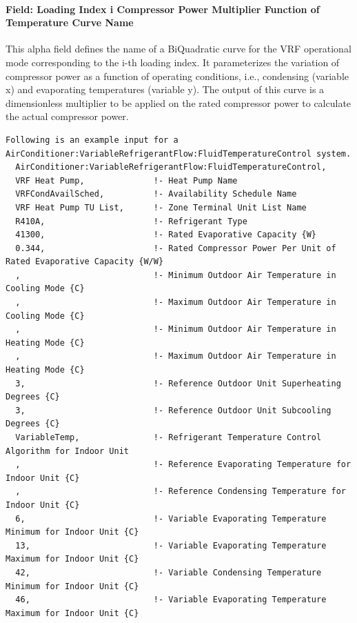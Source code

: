 \paragraph{Field: Loading Index i Compressor Power Multiplier Function of Temperature Curve Name}\label{field-loading-index-i-compressor-power-multiplier-function-of-temperature-curve-name}

This alpha field defines the name of a BiQuadratic curve for the VRF operational mode corresponding to the i-th loading index. It parameterizes the variation of compressor power as a function of operating conditions, i.e., condensing (variable x) and evaporating temperatures (variable y). The output of this curve is a dimensionless multiplier to be applied on the rated compressor power to calculate the actual compressor power.

\begin{lstlisting}
Following is an example input for a AirConditioner:VariableRefrigerantFlow:FluidTemperatureControl system.
  AirConditioner:VariableRefrigerantFlow:FluidTemperatureControl,
  VRF Heat Pump,              !- Heat Pump Name
  VRFCondAvailSched,          !- Availability Schedule Name
  VRF Heat Pump TU List,      !- Zone Terminal Unit List Name
  R410A,                      !- Refrigerant Type
  41300,                      !- Rated Evaporative Capacity {W}
  0.344,                      !- Rated Compressor Power Per Unit of Rated Evaporative Capacity {W/W}
  ,                           !- Minimum Outdoor Air Temperature in Cooling Mode {C}
  ,                           !- Maximum Outdoor Air Temperature in Cooling Mode {C}
  ,                           !- Minimum Outdoor Air Temperature in Heating Mode {C}
  ,                           !- Maximum Outdoor Air Temperature in Heating Mode {C}
  3,                          !- Reference Outdoor Unit Superheating Degrees {C}
  3,                          !- Reference Outdoor Unit Subcooling Degrees {C}
  VariableTemp,               !- Refrigerant Temperature Control Algorithm for Indoor Unit
  ,                           !- Reference Evaporating Temperature for Indoor Unit {C}
  ,                           !- Reference Condensing Temperature for Indoor Unit {C}
  6,                          !- Variable Evaporating Temperature Minimum for Indoor Unit {C}
  13,                         !- Variable Evaporating Temperature Maximum for Indoor Unit {C}
  42,                         !- Variable Condensing Temperature Minimum for Indoor Unit {C}
  46,                         !- Variable Evaporating Temperature Maximum for Indoor Unit {C}

\end{lstlisting}
